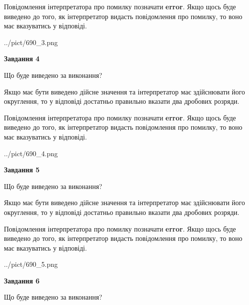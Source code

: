 \documentclass[12pt, ukrainian]{article}
\begin{document}
{\begin {Large}
Повідомлення інтерпретатора про помилку позначати \textbf{error}.
Якщо щось буде виведено до того, як інтерпретатор видасть повідомлення про помилку, 
то воно має вказуватись у відповіді. \par

\begin{center}
	{../pict/690_3.png}
\end{center}
\newpage

{\begin {center}\textbf{Завдання 4}\end {center}}\par
Що буде виведено за виконання? \par

Якщо має бути виведено дійсне значення та інтерпретатор має здійснювати його округлення, 
то у відповіді достатньо правильно вказати два дробових розряди.

Повідомлення інтерпретатора про помилку позначати \textbf{error}.
Якщо щось буде виведено до того, як інтерпретатор видасть повідомлення про помилку, 
то воно має вказуватись у відповіді. \par

\begin{center}
	{../pict/690_4.png}
\end{center}
\newpage

{\begin {center}\textbf{Завдання 5}\end {center}}\par
Що буде виведено за виконання? \par

Якщо має бути виведено дійсне значення та інтерпретатор має здійснювати його округлення, 
то у відповіді достатньо правильно вказати два дробових розряди.

Повідомлення інтерпретатора про помилку позначати \textbf{error}.
Якщо щось буде виведено до того, як інтерпретатор видасть повідомлення про помилку, 
то воно має вказуватись у відповіді. \par

\begin{center}
	{../pict/690_5.png}
\end{center}
\newpage

{\begin {center}\textbf{Завдання 6}\end {center}}\par
Що буде виведено за виконання? \par


\end{Large}}
\end{document}
